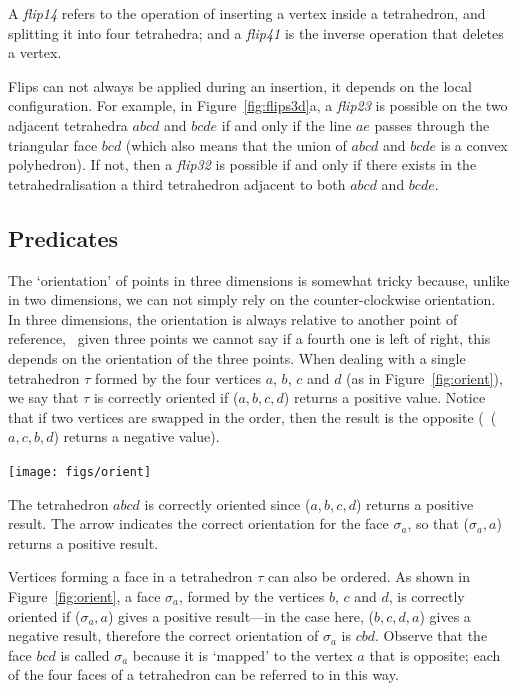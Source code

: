A \emph{flip14} refers to the operation of inserting a vertex inside a tetrahedron, and splitting it into four tetrahedra; and a \emph{flip41} is the inverse operation that deletes a vertex.

Flips can not always be applied during an insertion, it depends on the local configuration.
For example, in Figure~\ref{fig:flips3d}a, a \emph{flip23} is possible on the two adjacent tetrahedra $abcd$ and $bcde$ if and only if the line $ae$ passes through the triangular face $bcd$ (which also means that the union of $abcd$ and $bcde$ is a convex polyhedron). 
If not, then a \emph{flip32} is possible if and only if there exists in the tetrahedralisation a third tetrahedron adjacent to both $abcd$ and $bcde$.



\subsection{Predicates}

The `orientation' of points in three dimensions is somewhat tricky because, unlike in two dimensions, we can not simply rely on the counter-clockwise orientation. 
In three dimensions, the orientation is always relative to another point of reference, \ie\ given three points we cannot say if a fourth one is left of right, this depends on the orientation of the three points.
When dealing with a single tetrahedron $\tau$ formed by the four vertices $a$, $b$, $c$ and $d$ (as in Figure~\ref{fig:orient}), we say that $\tau$ is correctly oriented if \Orient($a,b,c,d$) returns a positive value. 
Notice that if two vertices are swapped in the order, then the result is the opposite (\ie\ \Orient($a,c,b,d$) returns a negative value). 
\begin{marginfigure}
  \centering
  \texttt{[image: figs/orient]}
  \caption[Orientation of a tetrahedron]{The tetrahedron $abcd$ is correctly oriented since \Orient($a,b,c,d$) returns a positive result. The arrow indicates the correct orientation for the face $\sigma_a$, so that \Orient($\sigma_a,a$) returns a positive result.}%
\label{fig:orient}
\end{marginfigure}

Vertices forming a face in a tetrahedron $\tau$ can also be ordered. 
As shown in Figure~\ref{fig:orient}, a face $\sigma_a$, formed by the vertices $b$, $c$ and $d$, is correctly oriented if \Orient($\sigma_a,a$) gives a positive result---in the case here, \Orient($b,c,d,a$) gives a negative result, therefore the correct orientation of $\sigma_a$ is $cbd$. Observe that the face $bcd$ is called $\sigma_a$ because it is `mapped' to the vertex $a$ that is opposite; each of the four faces of a tetrahedron can be referred to in this way.

